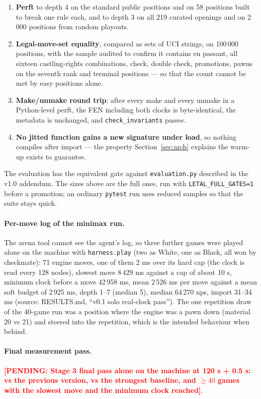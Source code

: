 \documentclass[11pt,a4paper]{article}
\newcommand{\pending}[1]{\textcolor{red}{\textbf{[PENDING: #1]}}}
\newcommand{\src}[1]{{\small(source: #1)}}
\newcommand{\code}[1]{\texttt{#1}}
\begin{document}
\begin{enumerate}[nosep]
  \item \textbf{Perft} to depth 4 on the standard public positions and on 58 positions built to break one
        rule each, and to depth 3 on all 219 curated openings and on 2\,000 positions from random playouts.
  \item \textbf{Legal-move-set equality}, compared as sets of UCI strings, on 100\,000 positions, with the
        sample audited to confirm it contains en passant, all sixteen castling-rights combinations, check,
        double check, promotions, pawns on the seventh rank and terminal positions --- so that the count
        cannot be met by easy positions alone.
  \item \textbf{Make/unmake round trip}: after every make and every unmake in a Python-level perft, the FEN
        including both clocks is byte-identical, the metadata is unchanged, and \code{check\_invariants}
        passes.
  \item \textbf{No jitted function gains a new signature under load}, so nothing compiles after import ---
        the property Section~\ref{sec:arch} explains the warm-up exists to guarantee.
\end{enumerate}

The evaluation has the equivalent gate against \code{evaluation.py} described in the v1.0 addendum. The
sizes above are the full ones, run with \code{LETAL\_FULL\_GATES=1} before a promotion; an ordinary
\code{pytest} run uses reduced samples so that the suite stays quick.
\paragraph{Per-move log of the minimax run.} The arena tool cannot see the agent's log, so three further games were played alone on the machine with \code{harness.play} (two as White, one as Black, all won by checkmate): 71 engine moves, one of them 2 ms over its hard cap (the clock is read every 128 nodes), slowest move 8\,429 ms against a cap of about 10 s, minimum clock before a move 42\,958 ms, mean 2\,526 ms per move against a mean soft budget of 2\,925 ms, depth 1--7 (median 5), median 64\,270 nps, import 31--34 ms \src{RESULTS.md, ``v0.1 solo real-clock pass''}. The one repetition draw of the 40-game run was a position where the engine was a pawn down (material 20 vs 21) and steered into the repetition, which is the intended behaviour when behind.
\paragraph{Final measurement pass.} \pending{Stage 3 final pass alone on the machine at 120 s + 0.5 s:
vs the previous version, vs the strongest baseline, and $\geq 40$ games with the slowest move and the
minimum clock reached}.
\end{document}
